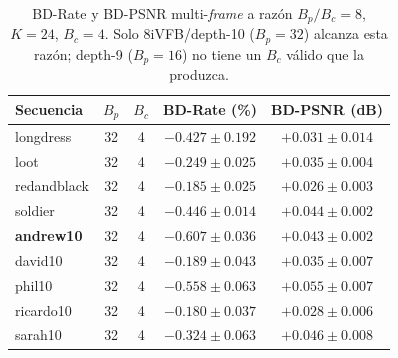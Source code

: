         \begin{table}[H]
            \centering
            \caption{BD-Rate y BD-PSNR multi-\textit{frame} a razón $B_p/B_c=8$, $K=24$,
            $B_c=4$. Solo 8iVFB/depth-10 ($B_p=32$) alcanza esta razón; depth-9 ($B_p=16$) no
            tiene un $B_c$ válido que la produzca.}
            \small
            \begin{tabular}{l|c|c|c|c}
                \hline
                \textbf{Secuencia} & $B_p$ & $B_c$ & \textbf{BD-Rate (\%)} & \textbf{BD-PSNR (dB)} \\
                \hline
                longdress & 32 & 4 & $-0.427 \pm 0.192$ & $+0.031 \pm 0.014$ \\
                loot & 32 & 4 & $-0.249 \pm 0.025$ & $+0.035 \pm 0.004$ \\
                redandblack & 32 & 4 & $-0.185 \pm 0.025$ & $+0.026 \pm 0.003$ \\
                soldier & 32 & 4 & $-0.446 \pm 0.014$ & $+0.044 \pm 0.002$ \\
                \textbf{andrew10} & 32 & 4 & $\mathbf{-0.607 \pm 0.036}$ & $\mathbf{+0.043 \pm 0.002}$ \\
                david10 & 32 & 4 & $-0.189 \pm 0.043$ & $+0.035 \pm 0.007$ \\
                phil10 & 32 & 4 & $-0.558 \pm 0.063$ & $+0.055 \pm 0.007$ \\
                ricardo10 & 32 & 4 & $-0.180 \pm 0.037$ & $+0.028 \pm 0.006$ \\
                sarah10 & 32 & 4 & $-0.324 \pm 0.063$ & $+0.046 \pm 0.008$ \\
                \hline
            \end{tabular}
            \label{tab:e10_bd_ratio8}
        \end{table}

